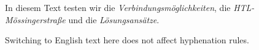 \documentclass[a4paper,12pt]{article}
\begin{document}
In diesem Text testen wir die \emph{Verbindungsmöglichkeiten}, 
die \emph{HTL-Mössingerstraße} und die \emph{Lösungsansätze}.


Switching to English text here does not affect hyphenation rules.
\end{document}

